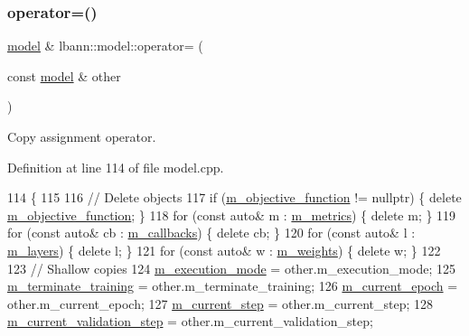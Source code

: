 \subsubsection{\texorpdfstring{operator=()}{operator=()}}
{\footnotesize\ttfamily \hyperlink{classlbann_1_1model}{model} \& lbann\+::model\+::operator= (\begin{DoxyParamCaption}\item[{const \hyperlink{classlbann_1_1model}{model} \&}]{other }\end{DoxyParamCaption})}

Copy assignment operator. 

Definition at line 114 of file model.\+cpp.


\begin{DoxyCode}
114                                           \{
115 
116   \textcolor{comment}{// Delete objects}
117   \textcolor{keywordflow}{if} (\hyperlink{classlbann_1_1model_a24c50e7108dd7698671aed7df5b22e8b}{m\_objective\_function} != \textcolor{keyword}{nullptr}) \{ \textcolor{keyword}{delete} 
      \hyperlink{classlbann_1_1model_a24c50e7108dd7698671aed7df5b22e8b}{m\_objective\_function}; \}
118   \textcolor{keywordflow}{for} (\textcolor{keyword}{const} \textcolor{keyword}{auto}& m : \hyperlink{classlbann_1_1model_ae75c9aafe9e5a93980cc1bbae986bc79}{m\_metrics})      \{ \textcolor{keyword}{delete} m; \}
119   \textcolor{keywordflow}{for} (\textcolor{keyword}{const} \textcolor{keyword}{auto}& cb : \hyperlink{classlbann_1_1model_a07b511fef30368494c2ad80922ffd0eb}{m\_callbacks})   \{ \textcolor{keyword}{delete} cb; \}
120   \textcolor{keywordflow}{for} (\textcolor{keyword}{const} \textcolor{keyword}{auto}& l : \hyperlink{classlbann_1_1model_a0229fc226ec163d1411548446104569d}{m\_layers})       \{ \textcolor{keyword}{delete} l; \}
121   \textcolor{keywordflow}{for} (\textcolor{keyword}{const} \textcolor{keyword}{auto}& w : \hyperlink{classlbann_1_1model_aaf9adefe4497d90bf5bc2567e71bfb00}{m\_weights})      \{ \textcolor{keyword}{delete} w; \}
122 
123   \textcolor{comment}{// Shallow copies}
124   \hyperlink{classlbann_1_1model_a2166e2aad256a335ace3bdcae5da2614}{m\_execution\_mode} = other.m\_execution\_mode;
125   \hyperlink{classlbann_1_1model_a639f9c3fcb81b905085f8b1932f8920f}{m\_terminate\_training} = other.m\_terminate\_training;
126   \hyperlink{classlbann_1_1model_a305fac94b9063e59198c7f936923221a}{m\_current\_epoch} = other.m\_current\_epoch;
127   \hyperlink{classlbann_1_1model_af31a76afc53061747d2170a65e98f692}{m\_current\_step} = other.m\_current\_step;
128   \hyperlink{classlbann_1_1model_af69e5f6bf49a4990fd4c18984705ab87}{m\_current\_validation\_step} = other.m\_current\_validation\_step;

\end{DoxyCode}
